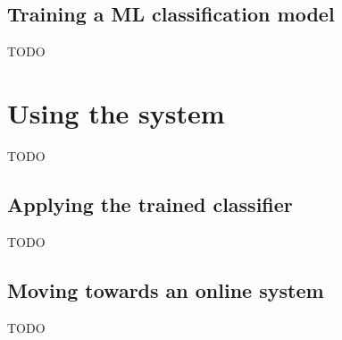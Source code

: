 


\subsection{Training a ML classification model}
\label{subsec:bci_pipeline_training_classification_model}
TODO

\section{Using the system}
\label{sec:bci_pipeline_using}
TODO


\subsection{Applying the trained classifier}
\label{subsec:bci_pipeline_using_classifier}
TODO


\subsection{Moving towards an online system}
\label{subsec:bci_pipeline_using_going_online}
TODO

